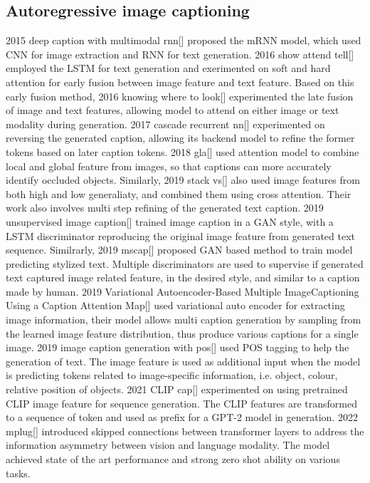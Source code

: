 \documentclass{article}
\begin{document}
\subsection{Autoregressive image captioning}
2015 deep caption with multimodal rnn[] proposed the mRNN model, which used CNN for image extraction and RNN for text generation. 2016 show attend tell[] employed the LSTM for text generation and exerimented on soft and hard attention for early fusion between image feature and text feature. Based on this early fusion method, 2016 knowing where to look[] experimented the late fusion of image and text features, allowing model to attend on either image or text modality during generation. 2017 cascade recurrent nn[] experimented on reversing the generated caption, allowing its backend model to refine the former tokens based on later caption tokens. 2018 gla[] used attention model to combine local and global feature from images, so that captions can more accurately identify occluded objects. Similarly, 2019 stack vs[] also used image features from both high and low generaliaty, and combined them using cross attention. Their work also involves multi step refining of the generated text caption. 2019 unsupervised image caption[] trained image caption in a GAN style, with a LSTM discriminator reproducing the original image feature from generated text sequence. Similrarly, 2019 mscap[] proposed GAN based method to train model predicting stylized text. Multiple discriminators are used to supervise if generated text captured image related feature, in the desired style, and similar to a caption made by human. 2019 Variational Autoencoder-Based Multiple ImageCaptioning Using a Caption Attention Map[] used variational auto encoder for extracting image information, their model allows multi caption generation by sampling from the learned image feature distribution, thus produce various captions for a single image. 2019 image caption generation with pos[] used POS tagging to help the generation of text. The image feature is used as additional input when the model is predicting tokens related to image-specific information, i.e. object, colour, relative position of objects. 2021 CLIP cap[] experimented on using pretrained CLIP image feature for sequence generation. The CLIP features are transformed to a sequence of token and used as prefix for a GPT-2 model in generation. 2022 mplug[] introduced skipped connections between transformer layers to address the information asymmetry between vision and language modality. The model achieved state of the art performance and strong zero shot ability on various tasks. 
\end{document}
